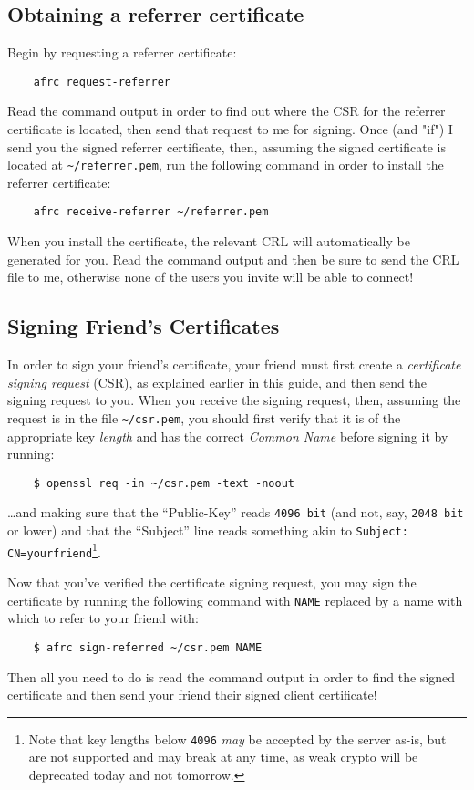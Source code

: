 \documentclass{article}
\begin{document}
{\subsection{Obtaining a referrer certificate}
Begin by requesting a referrer certificate:
\begin{lstlisting}
    afrc request-referrer
\end{lstlisting}
Read the command output in order to find out where the CSR for the referrer certificate is located, then send that request to me for signing.  Once (and "if") I send you the signed referrer certificate, then, assuming the signed certificate is located at \texttt{\textasciitilde /referrer.pem}, run the following command in order to install the referrer certificate:
\begin{lstlisting}
    afrc receive-referrer ~/referrer.pem
\end{lstlisting}
When you install the certificate, the relevant CRL will automatically be generated for you.  Read the command output and then be sure to send the CRL file to me, otherwise none of the users you invite will be able to connect!

\subsection{Signing Friend's Certificates}
In order to sign your friend's certificate, your friend must first create a \textit{certificate signing request} (CSR), as explained earlier in this guide, and then send the signing request to you.  When you receive the signing request, then, assuming the request is in the file \texttt{\textasciitilde /csr.pem}, you should first verify that it is of the appropriate key \textit{length} and has the correct \textit{Common Name} before signing it by running:
\begin{lstlisting}
    $ openssl req -in ~/csr.pem -text -noout
\end{lstlisting}
\ldots and making sure that the ``Public-Key'' reads \texttt{4096 bit} (and not, say, \texttt{2048 bit} or lower) and that the ``Subject'' line reads something akin to \texttt{Subject: CN=yourfriend}\footnote{Note that key lengths below \texttt{4096} \textit{may} be accepted by the server as-is, but are not supported and may break at any time, as weak crypto will be deprecated today and not tomorrow.}.

Now that you've verified the certificate signing request, you may sign the certificate by running the following command with \texttt{NAME} replaced by a name with which to refer to your friend with:
\begin{lstlisting}
    $ afrc sign-referred ~/csr.pem NAME
\end{lstlisting}
Then all you need to do is read the command output in order to find the signed certificate and then send your friend their signed client certificate!

}
\end{document}
